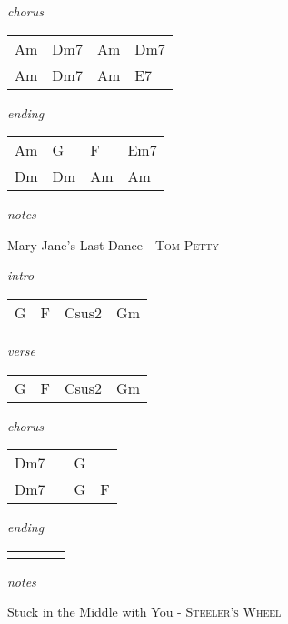 \documentclass[12pt]{article}
\begin{document}
\textit{chorus}

\begin{tabular}{|P{1.25in}|P{1.25in}|P{1.25in}|P{1.25in}|}
  Am  & Dm7  & Am  & Dm7  \\
  Am  & Dm7  & Am  & E7  \\
\end{tabular}

\textit{ending}

\begin{tabular}{|P{1.25in}|P{1.25in}|P{1.25in}|P{1.25in}|}
  Am  & G  & F  & Em7  \\
  Dm  & Dm  & Am  & Am  \\
\end{tabular}

\textit{notes}

\newpage


{\Huge Mary Jane's Last Dance} {\huge - \textsc{Tom Petty}}

\huge
\textit{intro}

\begin{tabular}{|P{1.25in}|P{1.25in}|P{1.25in}|P{1.25in}|}
  G & F & Csus2  &  Gm \\
\end{tabular}

\textit{verse}

\begin{tabular}{|P{1.25in}|P{1.25in}|P{1.25in}|P{1.25in}|}
  G & F  &  Csus2 &  Gm \\
\end{tabular}

\textit{chorus}

\begin{tabular}{|P{1.25in}|P{1.25in}|P{1.25in}|P{1.25in}|}
  Dm7 &   & G  &   \\
  Dm7 &   & G  &  F \\

\end{tabular}

\textit{ending}

\begin{tabular}{|P{1.25in}|P{1.25in}|P{1.25in}|P{1.25in}|}
   &   &   &   \\
\end{tabular}

\textit{notes}

\newpage

{\Huge Stuck in the Middle with You} {\huge - \textsc{Steeler's Wheel}}
\end{document}
